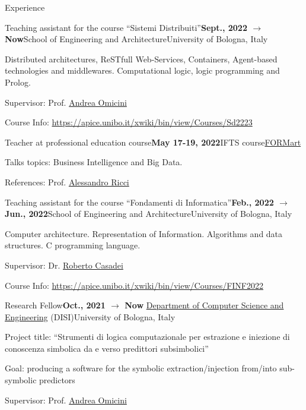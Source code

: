 \documentclass{resume} %
\begin{document}
    \begin{rSection}{Experience}
        
        \begin{rSubsection}{Teaching assistant for the course ``Sistemi Distribuiti''}{\textbf{Sept., 2022 $\rightarrow$ Now}}{School of Engineering and Architecture}{University of Bologna, Italy}
            \item Distributed architectures, ReSTfull Web-Services, Containers, Agent-based technologies and middlewares. Computational logic, logic programming and Prolog.
            \item Supervisor: Prof. \href{mailto:andrea.omicini@unibo.it}{Andrea Omicini}
            \item Course Info: \url{https://apice.unibo.it/xwiki/bin/view/Courses/Sd2223}
        \end{rSubsection}
        
        \begin{rSubsection}{Teacher at professional education course}{\textbf{May 17-19, 2022}}{IFTS course}{\href{http://www.formart.it/home}{FORMart}}
            \item Talks topics: Business Intelligence and Big Data.
            \item References:  Prof. \href{mailto:a.ricci@unibo.it}{Alessandro Ricci}
        \end{rSubsection}
        
        \begin{rSubsection}{Teaching assistant for the course ``Fondamenti di Informatica''}{\textbf{Feb., 2022 $\rightarrow$ Jun., 2022}}{School of Engineering and Architecture}{University of Bologna, Italy}
            \item Computer architecture. Representation of Information. Algorithms and data structures. C programming language.
            \item Supervisor: Dr. \href{mailto:roberto.casadei@unibo.it}{Roberto Casadei}
            \item Course Info: \url{https://apice.unibo.it/xwiki/bin/view/Courses/FINF2022}
        \end{rSubsection}
        
        \begin{rSubsection}{Research Fellow}{\textbf{Oct., 2021 $\rightarrow$ Now}}{ \href{https://disi.unibo.it/it}{Department of Computer Science and Engineering} (DISI)}{University of Bologna, Italy}
            \item Project title: ``Strumenti di logica computazionale per estrazione e iniezione di conoscenza simbolica da e verso predittori subsimbolici''
            \item Goal: producing a software for the symbolic extraction/injection from/into sub-symbolic predictors
            \item Supervisor: Prof. \href{mailto:andrea.omicini@unibo.it}{Andrea Omicini}
        \end{rSubsection}
        

\end{rSection}
\end{document}
